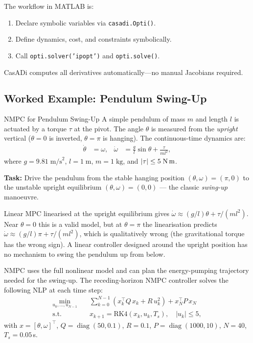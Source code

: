 The workflow in MATLAB is:
\begin{enumerate}[nosep]
	\item Declare symbolic variables via \texttt{casadi.Opti()}.
	\item Define dynamics, cost, and constraints symbolically.
	\item Call \texttt{opti.solver('ipopt')} and \texttt{opti.solve()}.
\end{enumerate}
CasADi computes all derivatives automatically---no manual Jacobians required.

\subsection{Worked Example: Pendulum Swing-Up}

\begin{examplebox}{NMPC for Pendulum Swing-Up}
	A simple pendulum of mass $m$ and length $l$ is actuated by a torque $\tau$ at the pivot. The angle $\theta$ is measured from the \emph{upright} vertical ($\theta = 0$ is inverted, $\theta = \pi$ is hanging). The continuous-time dynamics are:
	\begin{align*}
		\dot{\theta} &= \omega, &
		\dot{\omega} &= \frac{g}{l}\sin\theta + \frac{\tau}{m l^2},
	\end{align*}
	where $g = 9.81\;\text{m/s}^2$, $l = 1\;\text{m}$, $m = 1\;\text{kg}$, and $|\tau| \le 5\;\text{N\,m}$.

	\textbf{Task:} Drive the pendulum from the stable hanging position $(\theta, \omega) = (\pi, 0)$ to the unstable upright equilibrium $(\theta, \omega) = (0, 0)$ --- the classic \emph{swing-up} manoeuvre.

	\solution

	Linear MPC linearised at the upright equilibrium gives $\dot{\omega} \approx (g/l)\theta + \tau/(ml^2)$. Near $\theta = 0$ this is a valid model, but at $\theta = \pi$ the linearisation predicts $\dot{\omega} \approx (g/l)\pi + \tau/(ml^2)$, which is qualitatively wrong (the gravitational torque has the wrong sign). A linear controller designed around the upright position has no mechanism to swing the pendulum up from below.

	NMPC uses the full nonlinear model and can plan the energy-pumping trajectory needed for the swing-up. The receding-horizon NMPC controller solves the following NLP at each time step:
	\begin{align*}
		\min_{u_0, \dots, u_{N-1}} \quad & \sum_{k=0}^{N-1} (x_k^\top Q\, x_k + R\, u_k^2) + x_N^\top P\, x_N \\
		\text{s.t.} \quad & x_{k+1} = \text{RK4}(x_k, u_k, T_s), \quad |u_k| \le 5,
	\end{align*}
	with $x = [\theta, \omega]^\top$, $Q = \operatorname{diag}(50, 0.1)$, $R = 0.1$, $P = \operatorname{diag}(1000, 10)$, $N = 40$, $T_s = 0.05$\,s.
\end{examplebox}


